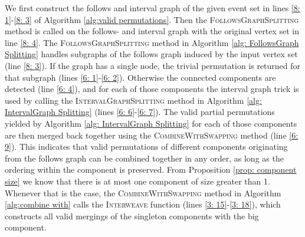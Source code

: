 %
%
%
%
%
We first construct the follows and interval graph of the given event set in lines \ref{8: 1}-\ref{8: 3} of Algorithm \ref{alg:valid permutations}.
Then the \textsc{FollowsGraphSplitting} method is called on the follows- and interval graph with the original vertex set in line \ref{8: 4}.
The \textsc{FollowsGraphSplitting} method in Algorithm \ref{alg: FollowsGraph Splitting} handles subgraphs of the follows graph induced by the input vertex set (line \ref{8: 3}).
If the graph has a single node, the trivial permutation is returned for that subgraph (lines \ref{6: 1}-\ref{6: 2}).
Otherwise the connected components are detected (line \ref{6: 4}), and for each of those components the interval graph trick is used by calling the \textsc{IntervalGraphSplitting} method in Algorithm  \ref{alg: IntervalGraph Splitting} (lines \ref{6: 6}-\ref{6: 7}).
The valid partial permutations yielded by Algorithm \ref{alg: IntervalGraph Splitting} for each of those components are then merged back together using the \textsc{CombineWithSwapping} method (line \ref{6: 9}).
This indicates that valid permutations of different components originating from the follows graph can be combined together in any order, as long as the ordering within the component is preserved.
From Proposition \ref{prop: component size} we know that there is at most one component of size greater than 1.
Whenever that is the case, the \textsc{CombineWithSwapping} method in Algorithm \ref{alg:combine with} calls the \textsc{Interweave} function (lines \ref{3: 15}-\ref{3: 18}), which constructs all valid mergings of the singleton components with the big component.

